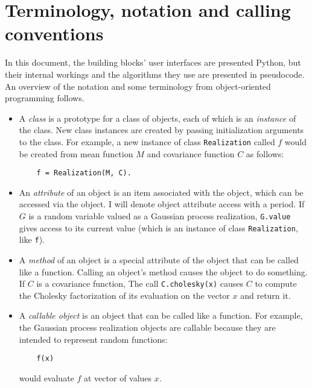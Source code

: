 \documentclass{report}
\begin{document}
\section{Terminology, notation and calling conventions} 

In this document, the building blocks' user interfaces are presented Python, but their internal workings and the algorithms they use are presented in pseudocode. An overview of the notation and some terminology from object-oriented programming follows.

\begin{itemize}
    \item A \emph{class} is a prototype for a class of objects, each of which is an \emph{instance} of the class. New class instances are created by passing initialization arguments to the class. For example, a new instance of class \texttt{Realization} called $f$ would be created from mean function $M$ and covariance function $C$ as follows:
\begin{verbatim}
    f = Realization(M, C).
\end{verbatim}
    
    \item An \emph{attribute} of an object is an item associated with the object, which can be accessed via the object. I will denote object attribute access with a period. If $G$ is a random variable valued as a Gaussian process realization, \texttt{G.value} gives access to its current value (which is an instance of class \texttt{Realization}, like \texttt{f}).
    
    \item A \emph{method} of an object is a special attribute of the object that can be called like a function. Calling an object's method causes the object to do something. If $C$ is a covariance function, The call \texttt{C.cholesky(x)} causes $C$ to compute the Cholesky factorization of its evaluation on the vector $x$ and return it.

    \item A \emph{callable object} is an object that can be called like a function. For example, the Gaussian process realization objects are callable because they are intended to represent random functions:
\begin{verbatim}
    f(x)
\end{verbatim}
would evaluate $f$ at vector of values $x$.%
\end{itemize}
\end{document}
